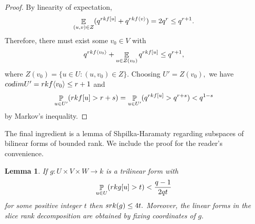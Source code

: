 \documentclass{daj}
\newtheorem{lemma}[theorem]{Lemma}
\newcommand{\E}{\mathop{\mathbb{E}}}
\renewcommand{\P}{\mathop{\mathbb{P}}}
\newcommand{\codim}{\textnormal{codim}}
\newcommand{\rk}{\textnormal{rk}}
\newcommand{\srk}{\textnormal{srk}}
\begin{document}
\begin{proof}
     By linearity of expectation,
    \[
    \E_{(u,v)\in Z} (q^{\rk f[u]}+q^{\rk f\langle v\rangle}) = 2q^r \le q^{r+1}.
    \]
    Therefore, there must exist some $v_0\in V$ with
    \[
    q^{\rk f\langle v_0\rangle}+\E_{u\in Z(v_0)}  q^{\rk f[u]} \le q^{r+1},
    \]
    where $Z(v_0) = \{u\in U: (u,v_0)\in Z\}.$ Choosing $U' = Z(v_0),$ we have \linebreak $\codim U' = \rk f\langle v_0\rangle \le r+1$ and 
    \[
    \P_{u\in U'} (\rk f[u] > r+s) = \P_{u\in U'} (q^{\rk f[u]} > q^{r+s}) < q^{1-s} 
    \]
    by Markov's inequality.
\end{proof}

The final ingredient is a lemma of Shpilka-Haramaty \cite{HS} regarding subspaces of bilinear forms of bounded rank. We include the proof for the reader's convenience.

\begin{lemma}\label{low-rk-der}
    If $g:U\times V\times W\to k$ is a trilinear form with
    $$\P_{u\in U} (\rk g[u] > t) < \frac{q-1}{2qt}$$ for some positive integer $t$ then $\srk (g) \le 4t.$ Moreover, the linear forms in the slice rank decomposition are obtained by fixing coordinates of $g.$
    \end{lemma}
\end{document}
